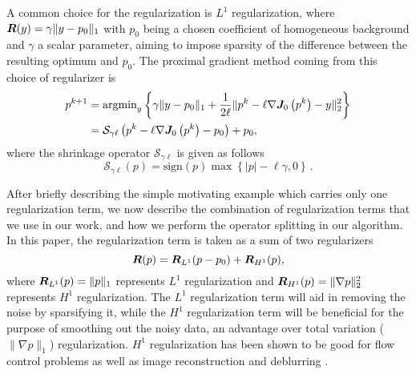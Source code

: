 A common choice for the regularization is $L^1$ regularization, where $\bm{R}(y) = \gamma \|y - p_0 \|_1$ with $p_0$ being a chosen coefficient of homogeneous background and $\gamma$ a scalar parameter, aiming to impose sparsity of the difference between the resulting optimum and $p_0$.  
The proximal gradient method coming from this choice of regularizer is
\begin{equation}
\begin{split}
     p^{k+1} 
     & = \text{argmin}_y \left\{\gamma \|y - p_0 \|_1 + \frac{1}{2\ell} \|p^{k}-\ell \nabla \bm{J}_0\left(p^{k}\right) - y\|_2^2\right\} \\
     & = \mathcal{S}_{\gamma \ell}\left(p^{k}-\ell \nabla \bm{J}_0\left(p^{k}\right) - p_0 \right) + p_0,
\end{split}
\end{equation}
where the shrinkage operator $\mathcal{S}_{\gamma \ell}$ \cite{Darbon2016AlgorithmsElsewhere,Darbon2015OnEquations,Yin2008BregmanSensing} is given as follows
\begin{equation}\label{shrinkage}
\mathcal{S}_{\gamma \ell }\left( p \right) =  \text{sign}\left( p \right)\max \left\{\left|p\right| - \ell \gamma,0\right\}\,.
\end{equation}

After briefly describing the simple motivating example which carries only one regularization term, we now describe the combination of regularization terms that we use in our work, and how we perform the operator splitting in our algorithm.
In this paper, the regularization term is taken as a sum of two regularizers
\begin{equation}
    \bm{R}(p) = \bm{R}_{L^1}(p - p_0) + \bm{R}_{H^1}(p),
\end{equation}
where $\bm{R}_{L^1}(p) = \|p\|_1$ represents $L^1$ regularization and $\bm{R}_{H^1}(p) = \|\nabla p\|_2^2$ represents $H^1$ regularization. The $L^1$ regularization term will aid in removing the noise by sparsifying it, while the $H^1$ regularization term will be beneficial for the purpose of smoothing out the noisy data, an advantage over total variation ($\|\nabla p\|_1$) regularization. $H^1$ regularization has been shown to be good for flow control problems \cite{Collis2001NumericalEquations, Heinkenschloss1998FormulationFlow} as well as image reconstruction and deblurring \cite{Ng2000CosineReconstruction, Kindermann2005DeblurringFunctionals}. 

